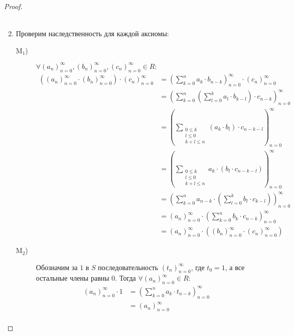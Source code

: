\documentclass[12pt,a4paper]{article}
\newcommand{\M}{\ensuremath{\mathrm{M}}\xspace}
\begin{document}
\begin{proof}
\begin{enumerate}
\begin{description}
\begin{align*}
                        \end{align*}
                \end{description}
            \item Проверим наследственность для каждой аксиомы:
                \begin{description}
                    \item[$\M_1$)] $\forall (a_n)_{n=0}^\infty, (b_n)_{n=0}^\infty, (c_n)_{n=0}^\infty \in R:$
                        \begin{align*}
                            ((a_n)_{n=0}^\infty \cdot (b_n)_{n=0}^\infty) \cdot (c_n)_{n=0}^\infty
                            &= \left(\sum_{k=0}^n a_k \cdot b_{n-k}\right)_{n=0}^\infty \cdot (c_n)_{n=0}^\infty\\
                            &= \left(\sum_{k=0}^n \left(\sum_{l=0}^k a_l \cdot b_{k-l}\right) \cdot c_{n-k}\right)_{n=0}^\infty\\
                            &= \left(\sum_{\substack{0 \leqslant k\\ l \leqslant 0\\ k+l \leqslant n}} (a_k \cdot b_l) \cdot c_{n-k-l}\right)_{n=0}^\infty\\
                            &= \left(\sum_{\substack{0 \leqslant k\\ l \leqslant 0\\ k+l \leqslant n}} a_k \cdot (b_l \cdot c_{n-k-l})\right)_{n=0}^\infty\\
                            &= \left(\sum_{k=0}^n a_{n-k} \cdot \left(\sum_{l=0}^k b_l \cdot c_{k-l}\right)\right)_{n=0}^\infty\\
                            &= (a_n)_{n=0}^\infty \cdot \left(\sum_{k=0}^n b_k \cdot c_{n-k}\right)_{n=0}^\infty\\
                            &= (a_n)_{n=0}^\infty \cdot ((b_n)_{n=0}^\infty \cdot (c_n)_{n=0}^\infty)
                        \end{align*}
                    \item[$\M_2$)] Обозначим за $1$ в $S$ последовательность $(t_n)_{n=0}^\infty$, где $t_0 = 1$, а все остальные члены равны $0$. Тогда $\forall (a_n)_{n=0}^\infty \in R:$
                        \begin{align*}
                            (a_n)_{n=0}^\infty \cdot 1
                            &= \left(\sum_{k=0}^n a_k \cdot t_{n-k}\right)_{n=0}^\infty\\
                            &= (a_n)_{n=0}^\infty\\

\end{align*}
\end{description}
\end{enumerate}
\end{proof}
\end{document}
